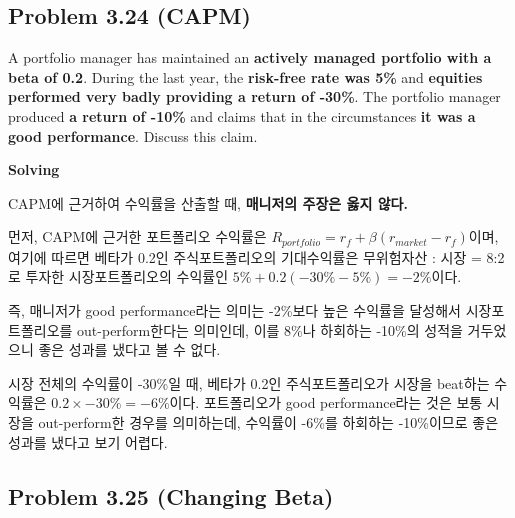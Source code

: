 \documentclass[
  letterpaper,
  DIV=11,
  numbers=noendperiod]{scrreprt}
\begin{document}
\subsection*{\texorpdfstring{\textbf{Problem 3.24}
(CAPM)}{Problem 3.24 (CAPM)}}\label{problem-3.24-capm}

A portfolio manager has maintained an \textbf{actively managed portfolio
with a beta of 0.2}. During the last year, the \textbf{risk-free rate
was 5\%} and \textbf{equities performed very badly providing a return of
-30\%}. The portfolio manager produced \textbf{a return of -10\%} and
claims that in the circumstances \textbf{it was a good performance}.
Discuss this claim.

\textbf{Solving}

CAPM에 근거하여 수익률을 산출할 때, \textbf{매니저의 주장은 옳지 않다.}

먼저, CAPM에 근거한 포트폴리오 수익률은
\(R_{portfolio}=r_f+\beta(r_{market}-r_f)\)이며, 여기에 따르면 베타가
0.2인 주식포트폴리오의 기대수익률은 무위험자산 : 시장 = 8:2로 투자한
시장포트폴리오의 수익률인 \(5\% + 0.2(-30\%-5\%)=-2\%\)이다.

즉, 매니저가 good performance라는 의미는 -2\%보다 높은 수익률을 달성해서
시장포트폴리오를 out-perform한다는 의미인데, 이를 8\%나 하회하는 -10\%의
성적을 거두었으니 좋은 성과를 냈다고 볼 수 없다.

\begin{tcolorbox}[enhanced jigsaw, titlerule=0mm, bottomtitle=1mm, left=2mm, title=\textcolor{quarto-callout-warning-color}{\faExclamationTriangle}\hspace{0.5em}{잘못푼 예시}, toptitle=1mm, bottomrule=.15mm, colframe=quarto-callout-warning-color-frame, breakable, opacityback=0, rightrule=.15mm, opacitybacktitle=0.6, coltitle=black, colback=white, arc=.35mm, colbacktitle=quarto-callout-warning-color!10!white, toprule=.15mm, leftrule=.75mm]

시장 전체의 수익률이 -30\%일 때, 베타가 0.2인 주식포트폴리오가 시장을
beat하는 수익률은 \(0.2\times -30\% =-6\%\)이다. 포트폴리오가 good
performance라는 것은 보통 시장을 out-perform한 경우를 의미하는데,
수익률이 -6\%를 하회하는 -10\%이므로 좋은 성과를 냈다고 보기 어렵다.

\end{tcolorbox}

\subsection*{\texorpdfstring{\textbf{Problem 3.25} (Changing
Beta)}{Problem 3.25 (Changing Beta)}}\label{problem-3.25-changing-beta}
\end{document}
